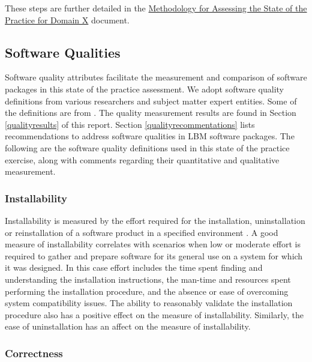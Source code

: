 \documentclass[12pt, notitlepage]{article}
\begin{document}
These steps are further detailed in the \href{https://github.com/smiths/AIMSS/blob/master/StateOfPractice/Methodology/Methodology.pdf}{Methodology for Assessing the State of the Practice for Domain X} document.

\subsection{Software Qualities}\label{softwarequalities}

Software quality attributes facilitate the measurement and comparison of software packages in this state of the practice assessment. We adopt software quality definitions from various researchers and subject matter expert entities. Some of the definitions are from \cite{Smithetal2020}. The quality measurement results are found in Section \ref{qualityresults} of this report. Section \ref{qualityrecommentations} lists recommendations to address software qualities in LBM software packages. The following are the software quality definitions used in this state of the practice exercise, along with comments regarding their quantitative and qualitative measurement.

\subsubsection{Installability} 

Installability is measured by the effort required for the installation, uninstallation or reinstallation of a software product in a specified
environment \citep{ISO/IEC25010} \citep{lenhard2013measuring}. A good measure of installability correlates with scenarios when low or moderate effort is required to gather and prepare software for its general use on a system for which it was designed. In this case effort includes the time spent finding and understanding the installation instructions, the man-time and resources spent performing the installation procedure, and the absence or ease of overcoming system compatibility issues. The ability to reasonably validate the installation procedure also has a positive effect on the measure of installability. Similarly, the ease of uninstallation has an affect on the measure of installability. 

\subsubsection{Correctness}
\end{document}

